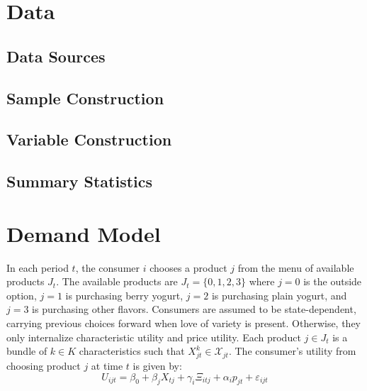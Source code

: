 \documentclass[12pt]{article}
\theoremstyle{definition}
\theoremstyle{remark}
\begin{document}

\section{Data}
\label{sec:data}

\subsection{Data Sources}

\subsection{Sample Construction}

\subsection{Variable Construction}

\subsection{Summary Statistics}


\section{Demand Model}
\label{sec:demand-model}

  In each period $t$, the consumer $i$ chooses a product $j$ from the menu of available products $J_t$. The available products are $J_t = \{0,1,2,3\}$ where $j=0$ is the outside option, $j=1$ is purchasing berry yogurt, $j=2$ is purchasing plain yogurt, and $j=3$ is purchasing other flavors. Consumers are assumed to be state-dependent, carrying previous choices forward when love of variety is present. Otherwise, they only internalize characteristic utility and price utility. Each product $j\in J_t$ is a bundle of $k\in K$ characteristics such that $X_{jt}^k \in \mathcal{X}_{jt}$. The consumer's utility from choosing product $j$ at time $t$ is given by:
\begin{equation}
\label{eq:utility}
  U_{ijt} = \beta_0 + \beta_jX_{tj} + \gamma_i\Xi_{itj} + \alpha_ip_{jt} +
  \varepsilon_{ijt}
\end{equation}
\end{document}
